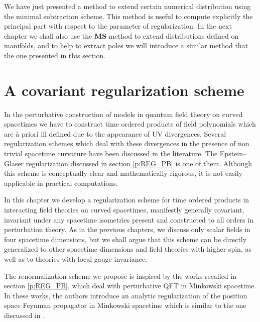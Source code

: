 \documentclass[11pt]{book}
\newcommand{\MS}{\textbf{MS}}
\theoremstyle{break}
\begin{document}
\bigskip


We have just presented a method to extend certain numerical distribution using the minimal subtraction scheme. This method is useful to compute explicitly the principal part with respect to the parameter of regularization. In the next chapter we shall also use the $\MS$ method to extend distributions defined on manifolds, and to help to extract poles we will introduce a similar method that the one presented in this section.



\chapter{A covariant regularization scheme}
\label{p:COV_REG}


In the perturbative construction of models in quantum field theory on curved spacetimes we have to construct time ordered products of field polynomials which are à priori ill defined due to the appearance of UV divergences. Several regularization schemes which deal with these divergences in the presence of non trivial spacetime curvature have been discussed in the literature. The Epstein--Glaser regularization discussed in section \ref{p:REG_PB} is one of them. Although this scheme is conceptually clear and mathematically rigorous, it is not easily applicable in practical computations. 


In this chapter we develop a regularization scheme for time ordered products in interacting field theories on curved spacetimes, manifestly generally covariant, invariant under any spacetime isometries present and constructed to all orders in perturbation theory. As in the previous chapters, we discuss only scalar fields in four spacetime dimensions, but we shall argue that this scheme can be directly generalized to other spacetime dimensions and field theories with higher spin, as well as to theories with local gauge invariance. 


The renormalization scheme we propose is inspired by the works \cite{keller_dimensional_2010,duetsch_dimensional_2014} recalled in section \ref{p:REG_PB}, which deal with perturbative QFT in Minkowski spacetime. In these works, the authors introduce an analytic regularization of the position space Feynman propagator in Minkowski spacetime which is similar to the one discussed in \cite{bollini_dimensional_2008}. 
\end{document}

